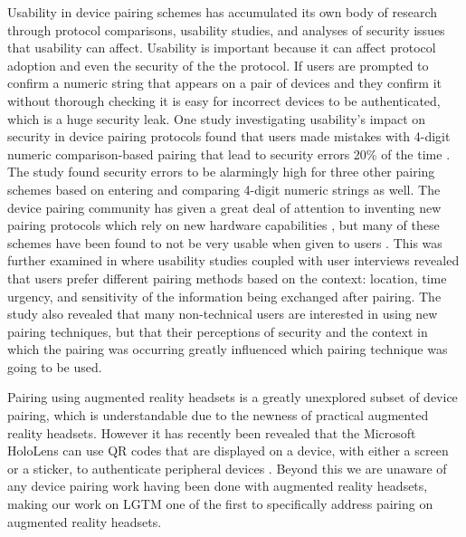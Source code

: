 \documentclass[12pt]{report}
\begin{document}
Usability in device pairing schemes has accumulated its own body of research \cite{UsabilitySecurityOutOfBandPairingKainda2009,UserPerceptionPairing,PlayfulPairingGallego2011,AliceMeetsBobKumar2009,SecurePairingUsabilityUzun2007,ConferenceCompStudySecurePairingKumar2009} through protocol comparisons, usability studies, and analyses of security issues that usability can affect. Usability is important because it can affect protocol adoption and even the security of the the protocol. If users are prompted to confirm a numeric string that appears on a pair of devices and they confirm it without thorough checking it is easy for incorrect devices to be authenticated, which is a huge security leak. One study investigating usability's impact on security in device pairing protocols found that users made mistakes with 4-digit numeric comparison-based pairing that lead to security errors 20\% of the time \cite{SecurePairingUsabilityUzun2007}. The study found security errors to be alarmingly high for three other pairing schemes based on entering and comparing 4-digit numeric strings as well. The device pairing community has given a great deal of attention to inventing new pairing protocols which rely on new hardware capabilities \cite{PlayfulPairingGallego2011,BedaSoriente2007,ShakeWellBeforeUseMayrhofer2009,SeeingIsBelievingMcCune2005,TalkingToStrangersSmetters2002,LoudAndClearGoodrich2006,HapadepSoriente2008,VisualChannelPairingSaxena2006}, but many of these schemes have been found to not be very usable when given to users \cite{SecurePairingUsabilityUzun2007,ConferenceCompStudySecurePairingKumar2009}. This was further examined in \cite{UserPerceptionPairing} where usability studies coupled with user interviews revealed that users prefer different pairing methods based on the context: location, time urgency, and sensitivity of the information being exchanged after pairing. The study also revealed that many non-technical users are interested in using new pairing techniques, but that their perceptions of security and the context in which the pairing was occurring greatly influenced which pairing technique was going to be used. \par

Pairing using augmented reality headsets is a greatly unexplored subset of device pairing, which is understandable due to the newness of practical augmented reality headsets. However it has recently been revealed that the Microsoft HoloLens can use QR codes that are displayed on a device, with either a screen or a sticker, to authenticate peripheral devices \cite{HoloLensVisualPairing2016}. Beyond this we are unaware of any device pairing work having been done with augmented reality headsets, making our work on LGTM one of the first to specifically address pairing on augmented reality headsets. \par
\end{document}
